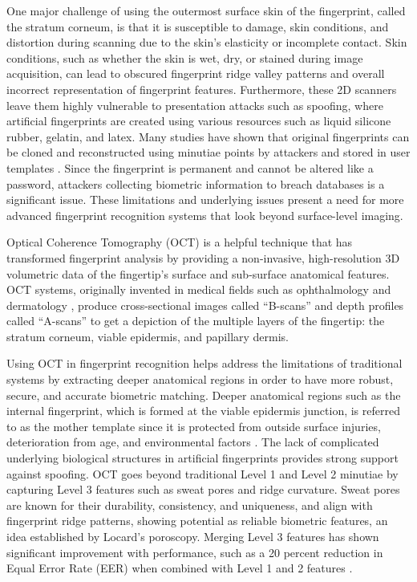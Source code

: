 One major challenge of using the outermost surface skin of the fingerprint, called the stratum corneum, is that it is susceptible to damage, skin conditions, and distortion during scanning due to the skin's elasticity or incomplete contact. Skin conditions, such as whether the skin is wet, dry, or stained during image acquisition, can lead to obscured fingerprint ridge valley patterns and overall incorrect representation of fingerprint features. Furthermore, these 2D scanners leave them highly vulnerable to presentation attacks such as spoofing, where artificial fingerprints are created using various resources such as liquid silicone rubber, gelatin, and latex. Many studies have shown that original fingerprints can be cloned and reconstructed using minutiae points by attackers and stored in user templates \parencite{sunSynchronousFingerprintAcquisition2020,liuFingerprintPresentationAttack2022,darlowEfficientInternalSurface2015}. Since the fingerprint is permanent and cannot be altered like a password, attackers collecting biometric information to breach databases is a significant issue. These limitations and underlying issues present a need for more advanced fingerprint recognition systems that look beyond surface-level imaging.

Optical Coherence Tomography (OCT) is a helpful technique that has transformed fingerprint analysis by providing a non-invasive, high-resolution 3D volumetric data of the fingertip's surface and sub-surface anatomical features. OCT systems, originally invented in medical fields such as ophthalmology and dermatology \parencite{fujimotoOpticalCoherenceTomography2000}, produce cross-sectional images called “B-scans” and depth profiles called “A-scans” to get a depiction of the multiple layers of the fingertip: the stratum corneum, viable epidermis, and papillary dermis.

Using OCT in fingerprint recognition helps address the limitations of traditional systems by extracting deeper anatomical regions in order to have more robust, secure, and accurate biometric matching. Deeper anatomical regions such as the internal fingerprint, which is formed at the viable epidermis junction, is referred to as the mother template since it is protected from outside surface injuries, deterioration from age, and environmental factors \parencite{yuMethodsApplicationsFingertip2023,dingSurfaceInternalFingerprint2021,liuLightweightNoiseRobustMethod2024}. The lack of complicated underlying biological structures in artificial fingerprints provides strong support against spoofing. OCT goes beyond traditional Level 1 and Level 2 minutiae by capturing Level 3 features such as sweat pores and ridge curvature. Sweat pores are known for their durability, consistency, and uniqueness, and align with fingerprint ridge patterns, showing potential as reliable biometric features, an idea established by Locard's poroscopy. Merging Level 3 features has shown significant improvement with performance, such as a 20 percent reduction in Equal Error Rate (EER) when combined with Level 1 and 2 features \parencite{jainPoresRidgesHighResolution2007}.
